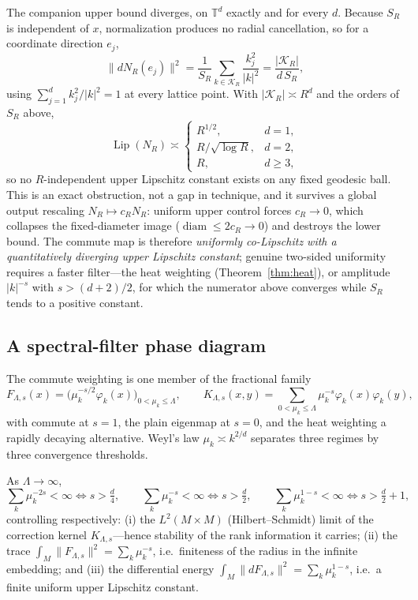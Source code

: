 \documentclass[review,supplement]{siamart220329}
\begin{document}
\begin{remark}\label{rem:torus-upper}
The companion upper bound diverges, on $\mathbb T^d$ exactly and for every $d$.
Because $S_R$ is independent of $x$, normalization produces no radial cancellation,
so for a coordinate direction $e_j$,
\[
\lVert dN_R(e_j)\rVert^2=\frac1{S_R}\sum_{k\in\mathcal K_R}\frac{k_j^2}{\lvert k\rvert^2}
=\frac{\lvert\mathcal K_R\rvert}{d\,S_R},
\]
using $\sum_{j=1}^d k_j^2/\lvert k\rvert^2=1$ at every lattice point. With
$\lvert\mathcal K_R\rvert\asymp R^d$ and the orders of $S_R$ above,
\[
\operatorname{Lip}(N_R)\asymp
\begin{cases}
R^{1/2}, & d=1,\\
R/\sqrt{\log R}, & d=2,\\
R, & d\ge3,
\end{cases}
\]
so no $R$-independent upper Lipschitz constant exists on any fixed geodesic ball.
This is an exact obstruction, not a gap in technique, and it survives a global
output rescaling $N_R\mapsto c_RN_R$: uniform upper control forces $c_R\to0$, which
collapses the fixed-diameter image ($\operatorname{diam}\le2c_R\to0$) and destroys
the lower bound. The commute map is therefore \emph{uniformly co-Lipschitz with a
quantitatively diverging upper Lipschitz constant}; genuine two-sided uniformity
requires a faster filter---the heat weighting (Theorem~\ref{thm:heat}), or amplitude
$\lvert k\rvert^{-s}$ with $s>(d+2)/2$, for which the numerator above converges while
$S_R$ tends to a positive constant.
\end{remark}

\subsection*{A spectral-filter phase diagram}
The commute weighting is one member of the fractional family
\[
F_{\Lambda,s}(x)=\bigl(\mu_k^{-s/2}\varphi_k(x)\bigr)_{0<\mu_k\le\Lambda},
\qquad
K_{\Lambda,s}(x,y)=\sum_{0<\mu_k\le\Lambda}\mu_k^{-s}\varphi_k(x)\varphi_k(y),
\]
with commute at $s=1$, the plain eigenmap at $s=0$, and the heat weighting a
rapidly decaying alternative. Weyl's law $\mu_k\asymp k^{2/d}$ separates three regimes
by three convergence thresholds.

\begin{proposition}\label{prop:phase}
As $\Lambda\to\infty$,
\[
\sum_k\mu_k^{-2s}<\infty\iff s>\tfrac d4,\qquad
\sum_k\mu_k^{-s}<\infty\iff s>\tfrac d2,\qquad
\sum_k\mu_k^{1-s}<\infty\iff s>\tfrac d2+1,
\]
controlling respectively: (i) the $L^2(M\times M)$ (Hilbert--Schmidt) limit of the
correction kernel $K_{\Lambda,s}$---hence stability of the rank information it carries;
(ii) the trace $\int_M\lVert F_{\Lambda,s}\rVert^2=\sum_k\mu_k^{-s}$, i.e.\ finiteness
of the radius in the infinite embedding; and (iii) the differential energy
$\int_M\lVert dF_{\Lambda,s}\rVert^2=\sum_k\mu_k^{1-s}$, i.e.\ a finite uniform upper
Lipschitz constant.
\end{proposition}
\end{document}
